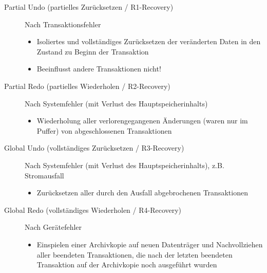 \documentclass{lehramt-informatik}
\begin{document}
\begin{description}

%

\item[Partial Undo (partielles Zurücksetzen / R1-Recovery)]

Nach Transaktionsfehler

\begin{itemize}
\item Isoliertes und vollständiges Zurücksetzen der veränderten Daten in
den Zustand zu Beginn der Transaktion

\item Beeinflusst andere Transaktionen nicht!
\end{itemize}

%

\item[Partial Redo (partielles Wiederholen / R2-Recovery)]

Nach Systemfehler (mit Verlust des Hauptspeicherinhalts)

\begin{itemize}
\item Wiederholung aller verlorengegangenen Änderungen (waren nur im
Puffer) von abgeschlossenen Transaktionen
\end{itemize}

%

\item[Global Undo (vollständiges Zurücksetzen / R3-Recovery)]

Nach Systemfehler (mit Verlust des Hauptspeicherinhalts), z.B.
Stromausfall

\begin{itemize}
\item Zurücksetzen aller durch den Ausfall abgebrochenen Transaktionen
\end{itemize}

%

\item[Global Redo (vollständiges Wiederholen / R4-Recovery)]

Nach Gerätefehler

\begin{itemize}
\item Einspielen einer Archivkopie auf neuen Datenträger und
Nachvollziehen aller beendeten Transaktionen, die nach der letzten
beendeten Transaktion auf der Archivkopie noch ausgeführt wurden
\end{itemize}

\end{description}
\end{document}

